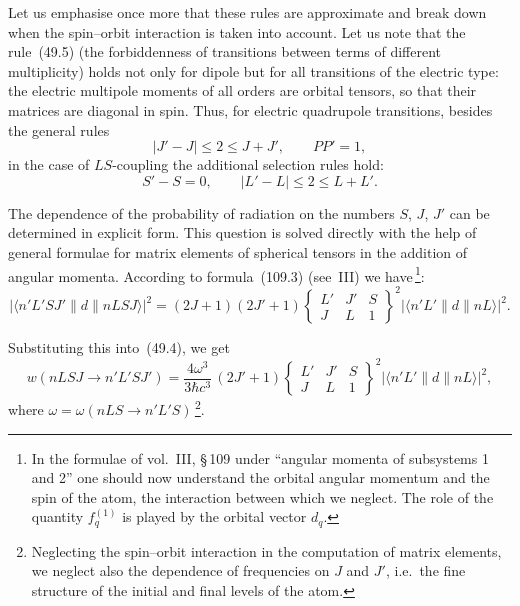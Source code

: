 Let us emphasise once more that these rules are approximate and break down when the spin--orbit interaction is taken into account. Let us note that the rule~(49.5) (the forbiddenness of transitions between terms of different multiplicity) holds not only for dipole but for all transitions of the electric type: the electric multipole moments of all orders are orbital tensors, so that their matrices are diagonal in spin. Thus, for electric quadrupole transitions, besides the general rules
\begin{equation}
|J' - J| \leqslant 2 \leqslant J + J',\qquad PP' = 1,
\tag{49.7}
\end{equation}
in the case of $LS$-coupling the additional selection rules hold:
\begin{equation}
S' - S = 0,\qquad |L' - L| \leqslant 2 \leqslant L + L'.
\tag{49.8}
\end{equation}

The dependence of the probability of radiation on the numbers $S$, $J$, $J'$ can be determined in explicit form. This question is solved directly with the help of general formulae for matrix elements of spherical tensors in the addition of angular momenta. According to formula~(109.3) (see~III) we have\,\footnote{In the formulae of vol.\ III, \S\,109 under ``angular momenta of subsystems 1 and 2'' one should now understand the orbital angular momentum and the spin of the atom, the interaction between which we neglect. The role of the quantity $f^{(1)}_q$ is played by the orbital vector $d_q$.}:
\begin{equation}
|\langle n'L'S J'\|d\|nLSJ\rangle|^2 = (2J+1)(2J'+1)\begin{Bmatrix} L' & J' & S \\ J & L & 1\end{Bmatrix}^{\!2}|\langle n'L'\|d\|nL\rangle|^2.
\tag{49.9}
\end{equation}

Substituting this into~(49.4), we get
\begin{equation}
w(nLSJ \to n'L'SJ') = \frac{4\omega^3}{3\hbar c^3}\,(2J'+1)\begin{Bmatrix} L' & J' & S \\ J & L & 1\end{Bmatrix}^{\!2}|\langle n'L'\|d\|nL\rangle|^2,
\tag{49.10}
\end{equation}
where $\omega = \omega(nLS \to n'L'S)$\,\footnote{Neglecting the spin--orbit interaction in the computation of matrix elements, we neglect also the dependence of frequencies on $J$ and $J'$, i.e.\ the fine structure of the initial and final levels of the atom.}.

